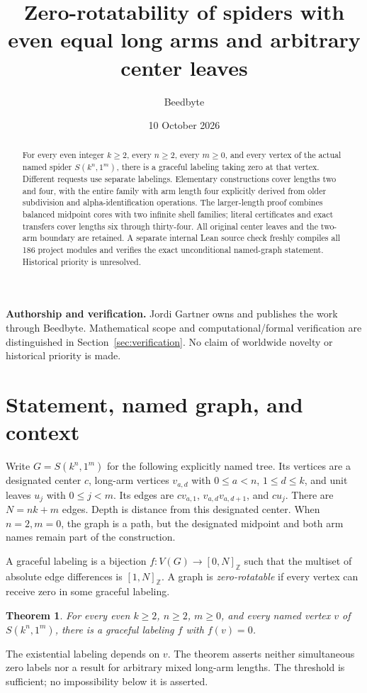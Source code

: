 \documentclass[11pt,a4paper]{article}
\title{Zero-rotatability of spiders with even equal long arms and arbitrary center leaves}
\author{Beedbyte}
\date{10 October 2026}
\newtheorem{theorem}{Theorem}[section]
\theoremstyle{definition}\newtheorem{definition}[theorem]{Definition}
\theoremstyle{remark}\newtheorem{remark}[theorem]{Remark}
\newcommand{\ints}[2]{[#1,#2]_{\mathbb Z}}
\begin{document}
\maketitle
\begin{abstract}
For every even integer $k\ge2$, every $n\ge2$, every $m\ge0$, and every
vertex of the actual named spider $S(k^n,1^m)$, there is a graceful
labeling taking zero at that vertex. Different requests use separate
labelings. Elementary constructions cover lengths two and four, with
the entire family with arm length four explicitly derived from older
subdivision and alpha-identification operations. The larger-length proof
combines balanced midpoint cores with two infinite shell families;
literal certificates and exact transfers cover lengths six through
thirty-four. All original center leaves and the two-arm boundary are
retained. A separate internal Lean source check freshly compiles all 186
project modules and verifies the exact unconditional named-graph
statement. Historical priority is unresolved.
\end{abstract}
\noindent\textbf{Authorship and verification.} Jordi Gartner owns and
publishes the work through Beedbyte. Mathematical scope and
computational/formal verification are distinguished in
Section~\ref{sec:verification}. No claim of worldwide novelty or
historical priority is made.
\tableofcontents

\section{Statement, named graph, and context}
\label{sec:statement}
Write $G=S(k^n,1^m)$ for the following explicitly named tree. Its vertices
are a designated center $c$, long-arm vertices $v_{a,d}$ with
$0\le a<n$, $1\le d\le k$, and unit leaves $u_j$ with $0\le j<m$.
Its edges are $cv_{a,1}$, $v_{a,d}v_{a,d+1}$, and $cu_j$.
There are $N=nk+m$ edges. Depth is distance from this designated center.
When $n=2,m=0$, the graph is a path, but the designated midpoint and both
arm names remain part of the construction.

A graceful labeling is a bijection $f:V(G)\to\ints0N$ such that the
multiset of absolute edge differences is $\ints1N$. A graph is
\emph{zero-rotatable} if every vertex can receive zero in some graceful
labeling.
\begin{theorem}\label{thm:main}
For every even $k\ge2$, $n\ge2$, $m\ge0$, and every named vertex $v$ of
$S(k^n,1^m)$, there is a graceful labeling $f$ with $f(v)=0$.
\end{theorem}
The existential labeling depends on $v$. The theorem asserts neither
simultaneous zero labels nor a result for arbitrary mixed long-arm lengths.
The threshold is sufficient; no impossibility below it is asserted.
\end{document}
